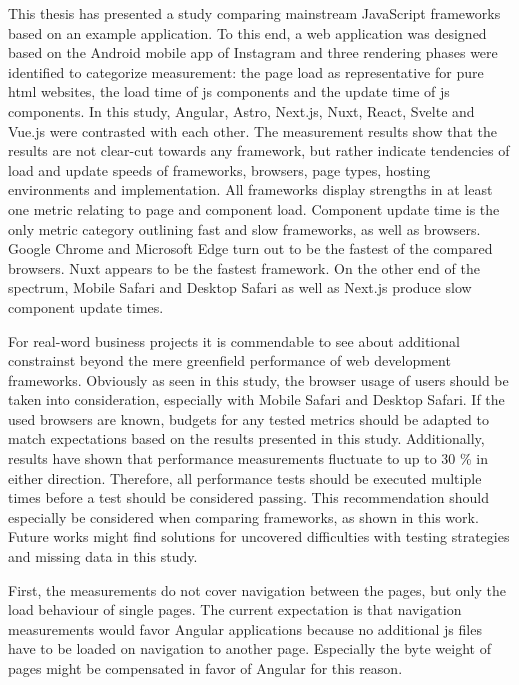 \documentclass[a4paper, 12pt]{article}
\begin{document}
This thesis has presented a study comparing mainstream JavaScript frameworks based on an example application.
To this end, a web application was designed based on the Android mobile app of Instagram and three rendering phases were identified to categorize measurement: the page load as representative for pure \acrshort{html} websites, the load time of \acrlong{js} components and the update time of \acrlong{js} components.
In this study, Angular, Astro, Next.js, Nuxt, React, Svelte and Vue.js were contrasted with each other.
The measurement results show that the results are not clear-cut towards any framework, but rather indicate tendencies of load and update speeds of frameworks, browsers, page types, hosting environments and implementation.
All frameworks display strengths in at least one metric relating to page and component load.
Component update time is the only metric category outlining fast and slow frameworks, as well as browsers.
Google Chrome and Microsoft Edge turn out to be the fastest of the compared browsers.
Nuxt appears to be the fastest framework.
On the other end of the spectrum, Mobile Safari and Desktop Safari as well as Next.js produce slow component update times.

For real-word business projects it is commendable to see about additional constrainst beyond the mere greenfield performance of web development frameworks.
Obviously as seen in this study, the browser usage of users should be taken into consideration, especially with Mobile Safari and Desktop Safari.
If the used browsers are known, budgets for any tested metrics should be adapted to match expectations based on the results presented in this study.
Additionally, results have shown that performance measurements fluctuate to up to 30 \% in either direction.
Therefore, all performance tests should be executed multiple times before a test should be considered passing.
This recommendation should especially be considered when comparing frameworks, as shown in this work.
\\

Future works might find solutions for uncovered difficulties with testing strategies and missing data in this study.

First, the measurements do not cover navigation between the pages, but only the load behaviour of single pages.
The current expectation is that navigation measurements would favor Angular applications because no additional \acrlong{js} files have to be loaded on navigation to another page.
Especially the byte weight of pages might be compensated in favor of Angular for this reason.
\end{document}
